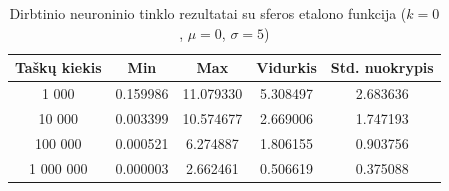 \begin{table}[H]
    \centering
    \begin{tabular}{|c|c|c|c|c|}
        \hline
        \textbf{Taškų kiekis} & \textbf{Min} & \textbf{Max} & \textbf{Vidurkis} & \textbf{Std. nuokrypis} \\ \hline
        1 000        & 0.159986 & 11.079330 & 5.308497 & 2.683636 \\ \hline
        10 000       & 0.003399 & 10.574677 & 2.669006 & 1.747193 \\ \hline
        100 000      & 0.000521 & 6.274887 & 1.806155 & 0.903756 \\ \hline
        1 000 000    & 0.000003 & 2.662461 & 0.506619 & 0.375088 \\ \hline
    \end{tabular}
    \caption{Dirbtinio neuroninio tinklo rezultatai su sferos etalono funkcija ($k = 0$, $\mu = 0$, $\sigma = 5$)}
\end{table}